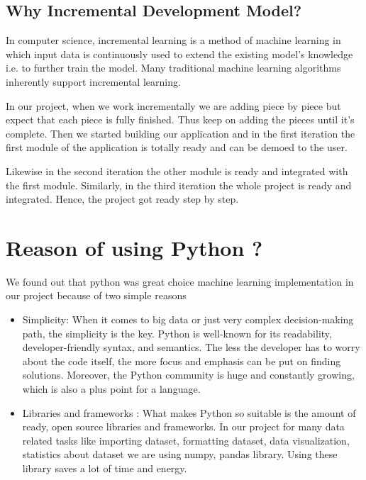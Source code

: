 \subsection{Why Incremental Development Model?}
In computer science, incremental learning is a method of machine learning in which input data is continuously used to extend the existing model's knowledge i.e. to further train the model. Many traditional machine learning algorithms inherently support incremental learning.\par
 In our project, when we work incrementally we are adding piece by piece but expect that each piece is fully finished. Thus keep on adding the pieces until it’s complete. 
Then we started building our application and in the first iteration the first module of the application is totally ready and can be demoed to the user.\par
Likewise in the second iteration the other module is ready and integrated with the first module. Similarly, in the third iteration the whole project is ready and integrated. Hence, the project got ready step by step.
\section{Reason of using  Python ?}
We found out that python was great choice machine learning implementation in our project because of two simple reasons
\begin{itemize}
\item Simplicity: When it comes to big data or just very complex decision-making path, the simplicity is the key. Python is well-known for its readability, developer-friendly syntax, and semantics. The less the developer has to worry about the code itself, the more focus and emphasis can be put on finding solutions. Moreover, the Python community is huge and constantly growing, which is also a plus point for a language.
\item Libraries and frameworks : What makes Python so suitable is the amount of ready, open source libraries and frameworks. In our project for many data related tasks like importing dataset, formatting dataset, data visualization, statistics about dataset we are using numpy, pandas library. Using these library saves a lot of time and energy.

\end{itemize}



